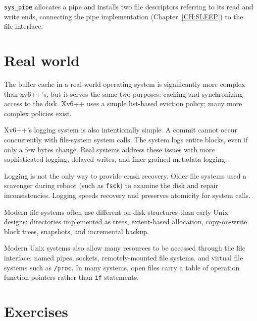 \lstinline{sys_pipe} allocates a pipe and installs two file descriptors referring to its read and write ends,
connecting the pipe implementation (Chapter~\ref{CH:SLEEP}) to the file interface.

\section{Real world}

The buffer cache in a real-world operating system is significantly more complex than xv6++'s, but it serves the
same two purposes: caching and synchronizing access to the disk.
Xv6++ uses a simple list-based eviction policy; many more complex policies exist.

Xv6++'s logging system is also intentionally simple.
A commit cannot occur concurrently with file-system system calls.
The system logs entire blocks, even if only a few bytes change.
Real systems address these issues with more sophisticated logging, delayed writes, and finer-grained metadata logging.

Logging is not the only way to provide crash recovery. Older file systems used a scavenger during reboot
(such as \lstinline{fsck}) to examine the disk and repair inconsistencies.
Logging speeds recovery and preserves atomicity for system calls.

Modern file systems often use different on-disk structures than early Unix designs:
directories implemented as trees, extent-based allocation, copy-on-write block trees,
snapshots, and incremental backup.

Modern Unix systems also allow many resources to be accessed through the file interface:
named pipes, sockets, remotely-mounted file systems, and virtual file systems such as \lstinline{/proc}.
In many systems, open files carry a table of operation function pointers rather than \lstinline{if} statements.

\section{Exercises}

